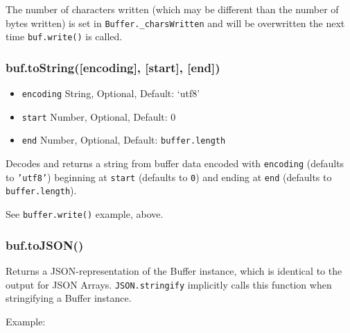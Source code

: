 \begin{Shaded}
\begin{Highlighting}[]
 \NormalTok{);}
\NormalTok{(}\NormalTok{, }\NormalTok{);}
 \NormalTok{+ }\NormalTok{(}\NormalTok{, }
\end{Highlighting}
\end{Shaded}

The number of characters written (which may be different than the number
of bytes written) is set in \texttt{Buffer.\_charsWritten} and will be
overwritten the next time \texttt{buf.write()} is called.

\subsubsection{buf.toString({[}encoding{]}, {[}start{]}, {[}end{]})}

\begin{itemize}
\item
  \texttt{encoding} String, Optional, Default: `utf8'
\item
  \texttt{start} Number, Optional, Default: 0
\item
  \texttt{end} Number, Optional, Default: \texttt{buffer.length}
\end{itemize}

Decodes and returns a string from buffer data encoded with
\texttt{encoding} (defaults to \texttt{'utf8'}) beginning at
\texttt{start} (defaults to \texttt{0}) and ending at \texttt{end}
(defaults to \texttt{buffer.length}).

See \texttt{buffer.write()} example, above.

\subsubsection{buf.toJSON()}

Returns a JSON-representation of the Buffer instance, which is identical
to the output for JSON Arrays. \texttt{JSON.stringify} implicitly calls
this function when stringifying a Buffer instance.

Example:


